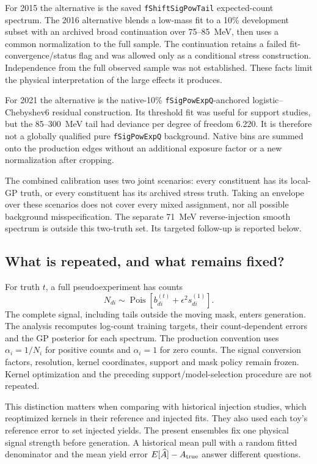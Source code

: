 For 2015 the alternative is the saved \texttt{fShiftSigPowTail}
expected-count spectrum. The 2016 alternative blends a low-mass fit to a
10\% development subset with an archived broad continuation over
75--85~MeV, then uses a common normalization to the full sample. The
continuation retains a failed fit-convergence/status flag and was allowed only as a
conditional stress construction. Independence from the full observed
sample was not established. These facts limit the physical interpretation
of the large effects it produces.

For 2021 the alternative is the native-10\%
\texttt{fSigPowExpQ}-anchored logistic--Chebyshev6 residual construction.
Its threshold fit was useful for support studies, but the 85--300~MeV
tail had deviance per degree of freedom 6.220. It is therefore not a
globally qualified pure \texttt{fSigPowExpQ} background. Native bins are
summed onto the production edges without an additional exposure factor
or a new normalization after cropping.

The combined calibration uses two joint scenarios: every constituent
has its local-GP truth, or every constituent has its archived stress truth.
Taking an envelope over these scenarios does not cover every mixed
assignment, nor all possible background misspecification. The separate
71~MeV reverse-injection smooth spectrum is outside this two-truth set.
Its targeted follow-up is reported below.

\subsection{What is repeated, and what remains fixed?}
For truth $t$, a full pseudoexperiment has counts
\begin{equation}
 N_{di}\sim\operatorname{Pois}\left[b^{(t)}_{di}
                  +\epsilon^2 s^{(1)}_{di}\right].
 \label{v5-eq:calibration-generation}
\end{equation}
The complete signal, including tails outside the moving mask, enters
generation. The analysis recomputes log-count training targets, their
count-dependent errors and the GP posterior for each spectrum. The
production convention uses $\alpha_i=1/N_i$ for positive counts and
$\alpha_i=1$ for zero counts. The signal conversion factors, resolution,
kernel coordinates, support and mask policy remain frozen. Kernel
optimization and the preceding support/model-selection procedure are
not repeated.

This distinction matters when comparing with historical injection studies,
which reoptimized kernels in their reference and injected fits. They also
used each toy's reference error to set injected yields. The present
ensembles fix one physical signal strength before generation. A historical
mean pull with a random fitted denominator and the mean yield error
$E[\widehat A]-A_{\rm true}$ answer different questions.

